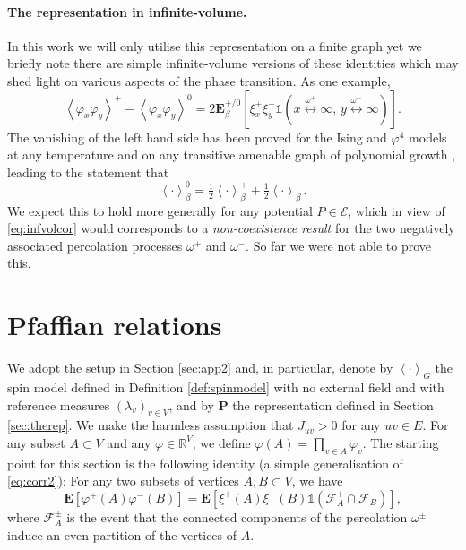 \documentclass{article}
\numberwithin{equation}{section}
\theoremstyle{definition}
\theoremstyle{definition}
\theoremstyle{remark}
\newcommand{\E}{\mathbb{E}}
\newcommand\vp{\varphi}
\newcommand\Ec{\mathcal{E}}
\newcommand\R{\mathbb{R}}
\newcommand{\w}{\omega}
\renewcommand{\l}{\lambda}
\newcommand{\vpp}{\vp^+}
\newcommand{\vpm}{\vp^-}
\renewcommand{\P}{\mathrm{\mathbf{P}}}
\renewcommand{\E}{\mathrm{\mathbf{E}}}
\renewcommand{\L}{\xi}
\renewcommand{\i}{\mathds{1}}
\newcommand{\F}{\mathcal{F}}
\begin{document}
\subsection{The representation in infinite-volume. }In this work we will only utilise this representation on a finite graph yet we briefly note there are simple infinite-volume versions of these identities which may shed light on various aspects of the phase transition. As one example, 
\begin{equation}\label{eq:infvolcor}
	\left< \vp_x \vp_y \right>^{+} -\left< \vp_x \vp_y \right>^{0} = 2 \E^{+ / 0}_\beta[ \L^+_x \L^-_y \i(  x \overset{\w^+}{\longleftrightarrow} \infty , \, y \overset{\w^-}{\longleftrightarrow} \infty   )].
\end{equation} 
The vanishing of the left hand side has been proved for the Ising and $\vp^4$ models at any temperature and on any transitive amenable graph of polynomial growth \cites{Rao17,GPPS}, leading to the statement that
\[
	\left< \cdot \right>^0_\beta = \tfrac{1}{2}\left< \cdot \right>^+_\beta + \tfrac{1}{2}\left< \cdot \right>^{-}_\beta.
\]
We expect this to hold more generally for any potential $P \in \Ec$, which in view of \eqref{eq:infvolcor} would corresponds to a \emph{non-coexistence result} for the two negatively associated percolation processes $\w^+$ and $\w^-$. 
So far we were not able to prove this.

\part{Pfaffian relations}\label{part:1} 

We adopt the setup in Section \ref{sec:app2} and, in particular, denote by $ \left< \cdot \right>_{G} $ the spin model defined in Definition \ref{def:spinmodel} with no external field and with reference measures $(\l_v)_{v\in V}$, and by $\P$ the representation defined in Section \ref{sec:therep}. We make the harmless assumption that $J_{uv} > 0$ for any $uv \in E$.
For any subset $A \subset V$ and any $\vp \in \R^V$, we define $\vp(A) = \prod_{v \in A} \vp_v$.
The starting point for this section is the following identity (a simple generalisation of \eqref{eq:corr2}): For any two subsets of vertices $A,B \subset V$, we have
\begin{equation}\label{eq:corrpm}
\E[ \vpp(A) \vpm(B) ] = \E [ \L^+(A) \L^-(B) \i( \F^+_A\cap  \F^-_B) ],
\end{equation}
where $ \F^\pm_A $ is the event that the connected components of the percolation $\w^\pm$ induce an even partition of the vertices of $A$. 
\end{document}
